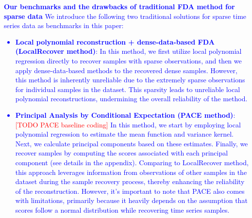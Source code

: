 \documentclass{article}
\begin{document}
\textcolor{blue}{
\textbf{Our benchmarks and the drawbacks of traditional FDA method for sparse data}
We introduce the following two traditional solutions for sparse time series data as benchmarks in this paper:
\begin{itemize}
  \item \textbf{Local polynomial reconstruction + dense-data-based FDA (LocalRecover method)}: 
  In this method, we first utilize local polynomial regression directly to recover samples with sparse observations, 
  and then we apply dense-data-based methods to the recovered dense samples. 
  However, this method is inherently unreliable due to the extremely sparse observations for individual samples in the dataset. 
  This sparsity leads to unreliable local polynomial reconstructions, 
  undermining the overall reliability of the method.
  \item \textbf{Principal Analysis by Conditional Expectation (PACE method)}: 
  \textcolor{red}{[TODO PACE baseline coding]} 
  In this method, we start by employing local polynomial regression to estimate the mean function and variance kernel. 
  Next, we calculate principal components based on these estimates. 
  Finally, we recover samples by computing the scores associated with each principal component (see details in the appendix).
  Comparing to LocalRecover method, this approach leverages information from observations of other samples in the dataset during the sample recovery process, 
  thereby enhancing the reliability of the reconstruction. 
  However, it's important to note that PACE also comes with limitations, primarily because it heavily depends on the assumption that scores follow a normal distribution while recovering time series samples.
\end{itemize}
}
\end{document}
